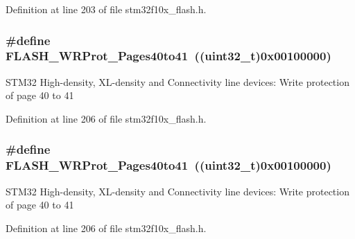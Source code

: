 Definition at line 203 of file stm32f10x\+\_\+flash.\+h.

\subsubsection[{\texorpdfstring{F\+L\+A\+S\+H\+\_\+\+W\+R\+Prot\+\_\+\+Pages40to41}{FLASH_WRProt_Pages40to41}}]{\setlength{\rightskip}{0pt plus 5cm}\#define F\+L\+A\+S\+H\+\_\+\+W\+R\+Prot\+\_\+\+Pages40to41~(({\bf uint32\+\_\+t})0x00100000)}\hypertarget{group___option___bytes___write___protection_gaaf0c1391987f76b381d26ff4b5142268}{}\label{group___option___bytes___write___protection_gaaf0c1391987f76b381d26ff4b5142268}
S\+T\+M32 High-\/density, X\+L-\/density and Connectivity line devices\+: Write protection of page 40 to 41 

Definition at line 206 of file stm32f10x\+\_\+flash.\+h.

\subsubsection[{\texorpdfstring{F\+L\+A\+S\+H\+\_\+\+W\+R\+Prot\+\_\+\+Pages40to41}{FLASH_WRProt_Pages40to41}}]{\setlength{\rightskip}{0pt plus 5cm}\#define F\+L\+A\+S\+H\+\_\+\+W\+R\+Prot\+\_\+\+Pages40to41~(({\bf uint32\+\_\+t})0x00100000)}\hypertarget{group___option___bytes___write___protection_gaaf0c1391987f76b381d26ff4b5142268}{}\label{group___option___bytes___write___protection_gaaf0c1391987f76b381d26ff4b5142268}
S\+T\+M32 High-\/density, X\+L-\/density and Connectivity line devices\+: Write protection of page 40 to 41 

Definition at line 206 of file stm32f10x\+\_\+flash.\+h.

